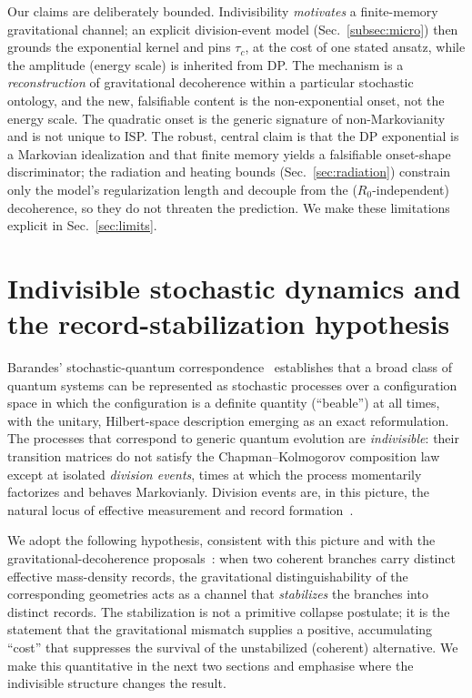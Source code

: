 \documentclass[aps,prd,onecolumn,amsmath,amssymb,nofootinbib,superscriptaddress]{revtex4-2}
\begin{document}
Our claims are deliberately bounded. Indivisibility \emph{motivates} a finite-memory gravitational
channel; an explicit division-event model (Sec.~\ref{subsec:micro}) then grounds the exponential
kernel and pins $\tau_c$, at the cost of one stated ansatz, while the amplitude (energy scale) is
inherited from DP. The mechanism is a \emph{reconstruction} of gravitational decoherence within a
particular stochastic ontology, and the new, falsifiable content is the non-exponential onset, not
the energy scale. The
quadratic onset is the generic signature of non-Markovianity and is not unique to ISP. The robust,
central claim is that the DP exponential is a Markovian idealization and that finite memory yields a
falsifiable onset-shape discriminator; the radiation and heating bounds (Sec.~\ref{sec:radiation})
constrain only the model's regularization length and decouple from the ($R_0$-independent) decoherence,
so they do not threaten the prediction. We make these
limitations explicit in Sec.~\ref{sec:limits}.

\section{Indivisible stochastic dynamics and the record-stabilization hypothesis}\label{sec:isp}

Barandes' stochastic-quantum correspondence~\cite{R11,R12} establishes that a broad class of quantum
systems can be represented as stochastic processes over a configuration space in which the
configuration is a definite quantity (``beable'') at all times, with the unitary, Hilbert-space
description emerging as an exact reformulation. The processes that correspond to generic quantum
evolution are \emph{indivisible}: their transition matrices do not satisfy the Chapman--Kolmogorov
composition law except at isolated \emph{division events}, times at which the process momentarily
factorizes and behaves Markovianly. Division events are, in this picture, the natural locus of
effective measurement and record formation~\cite{R11,R12}.

We adopt the following hypothesis, consistent with this picture and with the gravitational-decoherence
proposals~\cite{R1,R2,R3,R20}: when two coherent branches carry distinct effective mass-density
records, the gravitational distinguishability of the corresponding geometries acts as a channel that
\emph{stabilizes} the branches into distinct records. The stabilization is not a primitive collapse
postulate; it is the statement that the gravitational mismatch supplies a positive, accumulating
``cost'' that suppresses the survival of the unstabilized (coherent) alternative. We make this
quantitative in the next two sections and emphasise where the indivisible structure changes the
result.
\end{document}
